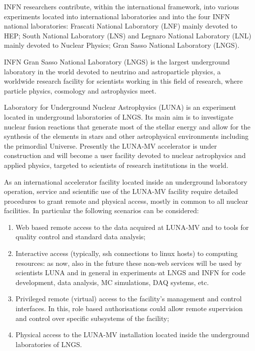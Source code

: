 \documentclass[fleqn,10pt]{wlscirep}
\begin{document}
{INFN researchers contribute, within the international framework, into various experiments located into international laboratories and into the four INFN national laboratories: Frascati National Laboratory (LNF) mainly devoted to HEP; South National Laboratory (LNS)  and Legnaro National Laboratory (LNL) mainly devoted to Nuclear Physics; Gran Sasso National Laboratory (LNGS).

INFN Gran Sasso National Laboratory (LNGS) is the largest underground laboratory in the world devoted to neutrino and astroparticle physics, a worldwide research facility for scientists working in this field of research, where particle physics, cosmology and astrophysics meet.

Laboratory for Underground Nuclear Astrophysics (LUNA) is an experiment located in underground laboratories of LNGS. Its main aim is to investigate nuclear fusion reactions that generate most of the stellar energy and allow for the synthesis of the elements in stars and other astrophysical environments including the primordial Universe. Presently the LUNA-MV accelerator is under construction and will become a user facility devoted to nuclear astrophysics and applied physics, targeted to scientists of research institutions in the world.

As an international accelerator facility located inside an underground laboratory operation, service and scientific use of the LUNA-MV facility require detailed procedures to grant remote and physical access, mostly in common to all nuclear facilities. In particular the following scenarios can be considered:
\begin{enumerate}
\item Web based remote access to the data acquired at LUNA-MV and to tools for quality control and standard data analysis;
\item Interactive access (typically, ssh connections to linux hosts) to computing resources: as now,  also in the future these non-web services will be used by scientists LUNA and in general in experiments at LNGS and INFN for code development, data analysis, MC simulations, DAQ systems, etc.
\item Privileged remote (virtual) access to the facility’s management and control interfaces. In this, role based authorisations could allow remote supervision and control over specific subsystems of the facility;
\item Physical access to the LUNA-MV installation located inside the underground laboratories of LNGS.
\end{enumerate}

}
\end{document}
